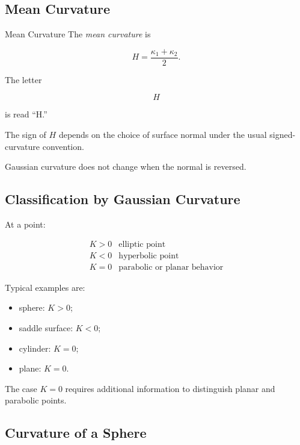 \subsection{Mean Curvature}
\label{subsec:mean-curvature}

\begin{definitionbox}{Mean Curvature}
The \emph{mean curvature} is

\[
\boxed{
H
=
\frac{\kappa_1+\kappa_2}{2}.
}
\]
\end{definitionbox}

The letter

\[
H
\]

is read ``H.''

The sign of \(H\) depends on the choice of surface normal under the usual
signed-curvature convention.

Gaussian curvature does not change when the normal is reversed.

\subsection{Classification by Gaussian Curvature}
\label{subsec:surface-point-classification}

At a point:

\[
\boxed{
\begin{array}{c|c}
K>0 & \text{elliptic point}\\
K<0 & \text{hyperbolic point}\\
K=0 & \text{parabolic or planar behavior}
\end{array}
}
\]

Typical examples are:

\begin{itemize}
    \item sphere: \(K>0\);
    \item saddle surface: \(K<0\);
    \item cylinder: \(K=0\);
    \item plane: \(K=0\).
\end{itemize}

The case \(K=0\) requires additional information to distinguish planar and
parabolic points.

\subsection{Curvature of a Sphere}
\label{subsec:curvature-sphere}

